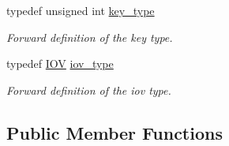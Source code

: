 \begin{DoxyCompactItemize}
typedef unsigned int \hyperlink{class_d_d4hep_1_1_alignments_1_1_alignment_ab824a65f935a0c79b9ea1a7a85014b88}{key\+\_\+type}
\begin{DoxyCompactList}\small\item\em Forward definition of the key type. \end{DoxyCompactList}\item 
typedef \hyperlink{class_d_d4hep_1_1_i_o_v}{I\+OV} \hyperlink{class_d_d4hep_1_1_alignments_1_1_alignment_afd988c803da5a514d8fa255784f29462}{iov\+\_\+type}
\begin{DoxyCompactList}\small\item\em Forward definition of the iov type. \end{DoxyCompactList}\end{DoxyCompactItemize}
\subsection*{Public Member Functions}
